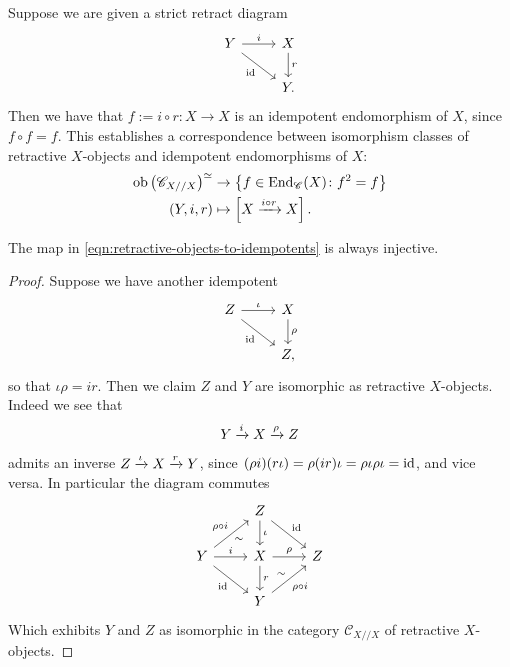 Suppose we are given a strict retract diagram
\[ \begin{tikzcd}
    Y\rar["i" above]\ar[dr,"\id" below left] & X\dar["r" right]\\
     & Y.
\end{tikzcd} \]
Then we have that $f := i\circ r \colon X \to X$ is an idempotent endomorphism of $X$, since $f\circ f = f$. This establishes a correspondence between isomorphism classes of retractive $X$-objects and idempotent endomorphisms of $X$:
\begin{equation}\label{eqn:retractive-objects-to-idempotents}
\begin{aligned}
    \mathrm{ob} \left(\mathscr{C}_{X // X}\right)^{\simeq} &\to \left\{ f\in \mathrm{End}_\mathscr{C}(X) \colon f^2 = f \right\} \\
    (Y,i,r) &\mapsto \left[X \xrightarrow{i\circ r} X\right].
\end{aligned}
\end{equation}
%
\begin{proposition} The map in \autoref{eqn:retractive-objects-to-idempotents} is always injective.
\end{proposition}
\begin{proof} Suppose we have another idempotent
\[ \begin{tikzcd}
    Z\rar["\iota" above]\ar[dr,"\id" below left] & X\dar["\rho" right]\\
     & Z,
\end{tikzcd} \]
so that $\iota\rho = ir$. Then we claim $Z$ and $Y$ are isomorphic as retractive $X$-objects. Indeed we see that
\begin{align*}
    Y \xrightarrow{i} X \xrightarrow{\rho} Z
\end{align*}
admits an inverse $Z\xrightarrow{\iota} X \xrightarrow{r} Y$, since $(\rho i)(r\iota) = \rho(ir)\iota = \rho\iota\rho\iota = \mathrm{id}$, and vice versa. In particular the diagram commutes
\[ \begin{tikzcd}
     & Z\dar["\iota"]\ar[dr,"\id" above right] & \\
     Y\rar["i" above]\ar[dr,"\id" below left]\ar[ur,"\rho\circ i" above left,"\sim" below right] & X\dar["r" right]\rar["\rho"] & Z\\
     & Y\ar[ur,"\rho\circ i" below right,"\sim" above left]\end{tikzcd} \]
Which exhibits $Y$ and $Z$ as isomorphic in the category $\mathscr{C}_{X//X}$ of retractive $X$-objects.
\end{proof}


